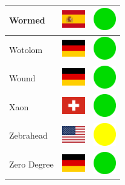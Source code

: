 \documentclass[12pt, a4paper, twoside]{report}
\begin{document}
\begin{center}
\begin{longtable}{|p{5cm}|p{2cm}|p{2cm}|}
 Wormed                                                     & \includegraphics[width=1cm]{4x3/es} &   \includegraphics[width=1cm]{likes/y} \\ \hline
 Wotolom                                                    & \includegraphics[width=1cm]{4x3/de} &   \includegraphics[width=1cm]{likes/y} \\ \hline
 Wound                                                      & \includegraphics[width=1cm]{4x3/de} &   \includegraphics[width=1cm]{likes/y} \\ \hline
 Xaon                                                       & \includegraphics[width=1cm]{4x3/ch} &   \includegraphics[width=1cm]{likes/y} \\ \hline
 Zebrahead                                                  & \includegraphics[width=1cm]{4x3/us} &   \includegraphics[width=1cm]{likes/m} \\ \hline
 Zero Degree                                                & \includegraphics[width=1cm]{4x3/de} &   \includegraphics[width=1cm]{likes/y} \\ \hline

\end{longtable}
\end{center}
\end{document}
